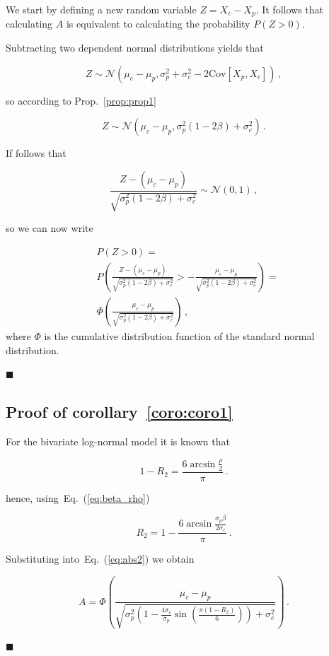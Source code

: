 \documentclass[12pt,a4paper]{article}
\newcommand*{\qed}{\hfill\ensuremath{\blacksquare}}%
\newcommand{\eref}[1]{Eq.~(\ref{eq:#1})}
\newcommand{\pref}[1]{Prop.~\ref{prop:#1}}
\newcommand{\creflong}[1]{corollary~\ref{coro:#1}}
\newcommand{\be}{\begin{equation}}
\newcommand{\ee}{\end{equation}}
\numberwithin{equation}{section}
\begin{document}
We start by defining a new random variable $Z = X_c-X_p$. It follows that calculating $A$ is equivalent to calculating the probability $P\left(Z>0\right)$.

Subtracting two dependent normal distributions yields that

\be
Z \sim \mathcal{N}\left(\mu_c - \mu_p,\sigma_p^2 + \sigma_c^2 - 2\text{Cov}\left[X_p,X_c\right]\right)\,,
\ee

so according to \pref{prop1}

\be
Z \sim \mathcal{N}\left(\mu_c - \mu_p,\sigma_p^2\left(1-2\beta\right) + \sigma_c^2\right)\,.
\ee

If follows that

\be
\frac{Z - \left(\mu_c - \mu_p\right)}{\sqrt{\sigma_p^2\left(1-2\beta\right) + \sigma_c^2}} \sim \mathcal{N}\left(0,1\right)\,,
\ee

so we can now write

\be
\begin{split}
&P\left(Z>0\right) = \\ & P\left(\frac{Z - (\mu_c - \mu_p)}{\sqrt{\sigma_p^2\left(1-2\beta\right) + \sigma_c^2}} > -\frac{\mu_c - \mu_p}{\sqrt{\sigma_p^2\left(1-2\beta\right) + \sigma_c^2}} \right) = \\ &\Phi\left(\frac{\mu_c - \mu_p}{\sqrt{\sigma_p^2\left(1 - 2\beta\right) + \sigma_c^2}}\right) \,,
\end{split}
\ee
where $\Phi$ is the cumulative distribution function of the standard normal distribution.

\qed

\subsection{Proof of \creflong{coro1}}

For the bivariate log-normal model it is known that~\citep{trivedi2007copula}

\be
1-R_2 = \frac{6\arcsin{\frac{\rho}{2}}}{\pi}\,.
\ee

hence, using~\eref{beta_rho}

\be
R_2 = 1- \frac{6\arcsin{\frac{\sigma_p\beta}{2\sigma_c}}}{\pi}\,.
\ee

Substituting into~\eref{abs2} we obtain

\be
A = \Phi\left(\frac{\mu_c - \mu_p}{\sqrt{\sigma_p^2\left(1 - \frac{4\sigma_c}{\sigma_p}\sin{\left(\frac{\pi\left(1-R_2\right)}{6}\right)}\right) + \sigma_c^2}}\right) \,.
\ee

\qed
\end{document}

